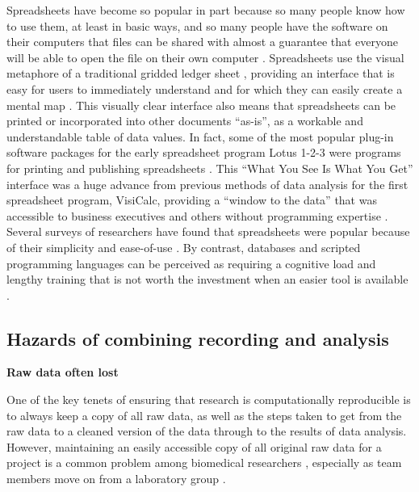 \documentclass[]{tufte-book}
\begin{document}
Spreadsheets have become so popular in part because so many people know how to
use them, at least in basic ways, and so many people have the software on their
computers that files can be shared with almost a guarantee that everyone will be
able to open the file on their own computer \citep{hermans2016spreadsheets}.
Spreadsheets use the visual metaphore of a traditional gridded ledger sheet
\citep{levy1984spreadsheet}, providing an interface that is easy for users to
immediately understand and for which they can easily create a mental map
\citep{birch2018future, barga2011bioinformatics}. This visually clear interface also means that
spreadsheets can be printed or incorporated into other documents ``as-is'', as a
workable and understandable table of data values. In fact, some of the most
popular plug-in software packages for the early spreadsheet program Lotus 1-2-3
were programs for printing and publishing spreadsheets \citep{campbell2007number}.
This ``What You See Is What You Get'' interface was a huge advance from previous
methods of data analysis for the first spreadsheet program, VisiCalc, providing
a ``window to the data'' that was accessible to business executives and others
without programming expertise \citep{creeth1985microcomputer}. Several surveys of
researchers have found that spreadsheets were popular because of their
simplicity and ease-of-use \citep{anderson2007issues, altarawneh2017pilot, barga2011bioinformatics}. By contrast, databases and scripted programming
languages can be perceived as requiring a cognitive load and lengthy training
that is not worth the investment when an easier tool is available
\citep{hermans2016spreadsheets, anderson2007issues, myneni2010organization, barga2011bioinformatics, topaloglou2004biological}.

\subsection{Hazards of combining recording and analysis}\label{hazards-of-combining-recording-and-analysis}

\textbf{Raw data often lost}

One of the key tenets of ensuring that research is computationally reproducible
is to always keep a copy of all raw data, as well as the steps taken to get from
the raw data to a cleaned version of the data through to the results of data
analysis. However, maintaining an easily accessible copy of all original raw data
for a project is a common problem among biomedical researchers
\citep{goodman2014ten}, especially as team members move on from a laboratory group
\citep{myneni2010organization}.
\end{document}
